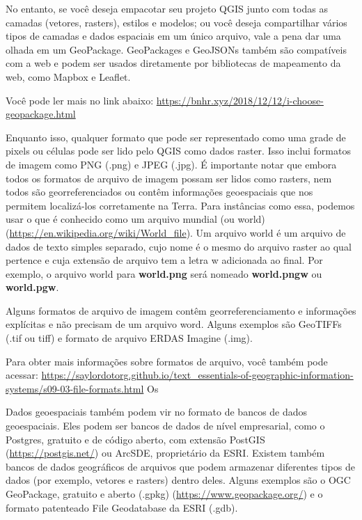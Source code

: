 \documentclass[
]{book}
\begin{document}
No entanto, se você deseja empacotar seu projeto QGIS junto com todas as camadas (vetores, rasters), estilos e modelos; ou você deseja compartilhar vários tipos de camadas e dados espaciais em um único arquivo, vale a pena dar uma olhada em um GeoPackage. GeoPackages e GeoJSONs também são compatíveis com a web e podem ser usados diretamente por bibliotecas de mapeamento da web, como Mapbox e Leaflet.

Você pode ler mais no link abaixo: \href{https://bnhr.xyz/2018/12/12/i-choose\%20-geopackage.html}{https://bnhr.xyz/2018/12/12/i-choose-geopackage.html}

Enquanto isso, qualquer formato que pode ser representado como uma grade de pixels ou células pode ser lido pelo QGIS como dados raster. Isso inclui formatos de imagem como PNG (.png) e JPEG (.jpg). É importante notar que embora todos os formatos de arquivo de imagem possam ser lidos como rasters, nem todos são georreferenciados ou contêm informações geoespaciais que nos permitem localizá-los corretamente na Terra. Para instâncias como essa, podemos usar o que é conhecido como um arquivo mundial (ou world) (\url{https://en.wikipedia.org/wiki/World_file}). Um arquivo world é um arquivo de dados de texto simples separado, cujo nome é o mesmo do arquivo raster ao qual pertence e cuja extensão de arquivo tem a letra w adicionada ao final. Por exemplo, o arquivo world para \textbf{world.png} será nomeado \textbf{world.pngw} ou \textbf{world.pgw}.

Alguns formatos de arquivo de imagem contêm georreferenciamento e informações explícitas e não precisam de um arquivo word. Alguns exemplos são GeoTIFFs (.tif ou tiff) e formato de arquivo ERDAS Imagine (.img).

Para obter mais informações sobre formatos de arquivo, você também pode acessar: \href{https://saylordotorg.\%20github.io/text_essentials-of-geographic-information-systems/s09-03-file-formats.html}{https://saylordotorg.github.io/text\_essentials-of-geographic-information-systems/s09-03-file-formats.html} Os

Dados geoespaciais também podem vir no formato de bancos de dados geoespaciais. Eles podem ser bancos de dados de nível empresarial, como o Postgres, gratuito e de código aberto, com extensão PostGIS (\url{https://postgis.net/}) ou ArcSDE, proprietário da ESRI. Existem também bancos de dados geográficos de arquivos que podem armazenar diferentes tipos de dados (por exemplo, vetores e rasters) dentro deles. Alguns exemplos são o OGC GeoPackage, gratuito e aberto (.gpkg) (\url{https://www.geopackage.org/}) e o formato patenteado File Geodatabase da ESRI (.gdb).
\end{document}
